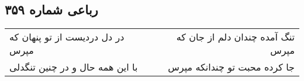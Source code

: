 \begin{center}
\section*{رباعی شماره ۳۵۹}
\label{sec:sh359}
\begin{longtable}{l p{0.5cm} r}
در دل دردیست از تو پنهان که مپرس
&&
تنگ آمده چندان دلم از جان که مپرس
\\
با این همه حال و در چنین تنگدلی
&&
جا کرده محبت تو چندانکه مپرس
\\
\end{longtable}
\end{center}
